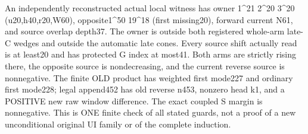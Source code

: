 An independently reconstructed actual local witness has owner
1^21 2^20 3^20 (u20,h40,r20,W60), opposite1^50 19^18
(first missing20), forward current N61, and source overlap depth37.
The owner is outside both registered whole-arm late-C wedges and
outside the automatic late cones. Every source shift actually read
is at least20 and has protected G index at most41. Both arms are
strictly rising there, the opposite source is nondecreasing, and the
current reverse source is nonnegative. The finite OLD product has
weighted first mode227 and ordinary first mode228; legal append452
has old reverse n453, nonzero head k1, and a POSITIVE new raw window
difference. The exact coupled S margin is nonnegative. This is ONE
finite check of all stated guards, not a proof of a new unconditional
original UI family or of the complete induction.
